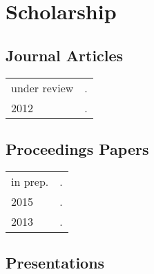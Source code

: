 \documentclass[11pt,letterpaper,twoside]{article}
\makeatletter
\newenvironment{cvsection}{%
  \renewcommand{\arraystretch}{1.75}
  \begin{longtable}[l]{@{} L R @{}}
}{%
  \end{longtable}
}
\makeatother
\begin{document}



\section*{Scholarship}

\subsection*{Journal Articles}

\begin{cvsection}
  under review & \null{}.\\

  2012 & \null{}.\\
\end{cvsection}

\subsection*{Proceedings Papers}

\begin{cvsection}
  in prep. & \null{}.\\

  2015 & \null{}.\\

  2013 & \null{}.\\
\end{cvsection}

\subsection*{Presentations}
\end{document}

